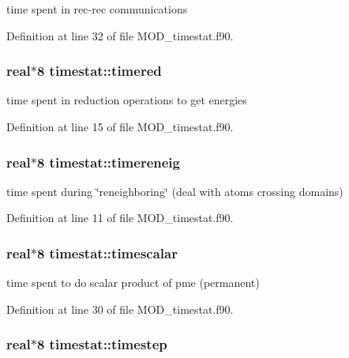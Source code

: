 time spent in rec-\/rec communications 



Definition at line 32 of file M\-O\-D\-\_\-timestat.\-f90.

\hypertarget{classtimestat_aa435182a301d010879aba033cbe89ac6}{
\subsubsection[{timered}]{\setlength{\rightskip}{0pt plus 5cm}real$\ast$8 timestat\-::timered}}\label{classtimestat_aa435182a301d010879aba033cbe89ac6}


time spent in reduction operations to get energies 



Definition at line 15 of file M\-O\-D\-\_\-timestat.\-f90.

\hypertarget{classtimestat_a598e9cddb7b3ec4852e8d74d42f4e06d}{
\subsubsection[{timereneig}]{\setlength{\rightskip}{0pt plus 5cm}real$\ast$8 timestat\-::timereneig}}\label{classtimestat_a598e9cddb7b3ec4852e8d74d42f4e06d}


time spent during \char`\"{}reneighboring\char`\"{} (deal with atoms crossing domains) 



Definition at line 11 of file M\-O\-D\-\_\-timestat.\-f90.

\hypertarget{classtimestat_a2223e0c223cbc29e77375d92ccf3e760}{
\subsubsection[{timescalar}]{\setlength{\rightskip}{0pt plus 5cm}real$\ast$8 timestat\-::timescalar}}\label{classtimestat_a2223e0c223cbc29e77375d92ccf3e760}


time spent to do scalar product of pme (permanent) 



Definition at line 30 of file M\-O\-D\-\_\-timestat.\-f90.

\hypertarget{classtimestat_a4e45aa5368ee73cf0b5e0e181b56cf59}{
\subsubsection[{timestep}]{\setlength{\rightskip}{0pt plus 5cm}real$\ast$8 timestat\-::timestep}}\label{classtimestat_a4e45aa5368ee73cf0b5e0e181b56cf59}


